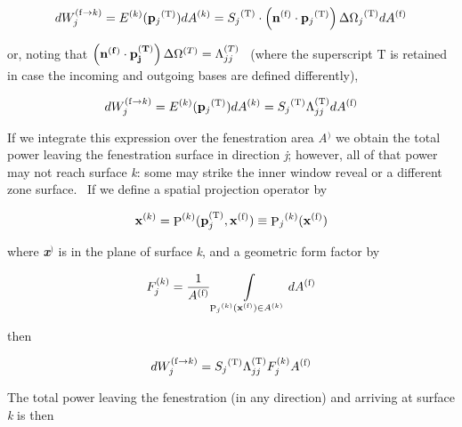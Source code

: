 \begin{equation}
dW_j^{{\rm{(f}} \to k{\rm{)}}} = {E^{{\rm{(}}k{\rm{)}}}}({{\bf{p}}_j}^{{\rm{(T)}}})d{A^{{\rm{(}}k{\rm{)}}}} = {S_j}^{{\rm{(T)}}} \cdot \left( {{{\bf{n}}^{{\rm{(f)}}}} \cdot {{\bf{p}}_j}^{{\rm{(T)}}}} \right)\Delta {\Omega_j}^{{\rm{(T)}}}d{A^{{\rm{(f)}}}}
\end{equation}

or, noting that \(\left(\bf{n}^{(f)}\cdot\bf{p}_j^{(T)}\right) \Delta\Omega^{(T)} = \Lambda_{jj}^{(T)}\) ~(where the superscript T is retained in case the incoming and outgoing bases are defined differently),

\begin{equation}
dW_j^{{\rm{(f}} \to k{\rm{)}}} = {E^{{\rm{(}}k{\rm{)}}}}({{\bf{p}}_j}^{{\rm{(T)}}})d{A^{{\rm{(}}k{\rm{)}}}} = {S_j}^{{\rm{(T)}}}\Lambda_{jj}^{{\rm{(T)}}}d{A^{{\rm{(f)}}}}
\end{equation}

If we integrate this expression over the fenestration area \emph{A}\(^{)}\) we obtain the total power leaving the fenestration surface in direction \emph{j}; however, all of that power may not reach surface \emph{k}: some may strike the inner window reveal or a different zone surface.~ If we define a spatial projection operator by

\begin{equation}
{{\bf{x}}^{{\rm{(}}k{\rm{)}}}} = {{\mathop{\rm P}\nolimits} ^{{\rm{(}}k{\rm{)}}}}({\bf{p}}_j^{{\rm{(T)}}},{{\bf{x}}^{{\rm{(f)}}}}) \equiv {{\mathop{\rm P}\nolimits}_j}^{{\rm{(}}k{\rm{)}}}({{\bf{x}}^{{\rm{(f)}}}})
\end{equation}

where \textbf{\emph{x}}\(^{)}\) is in the plane of surface \emph{k}, and a geometric form factor by

\begin{equation}
F_j^{{\rm{(}}k{\rm{)}}} = \frac{1}{{{A^{{\rm{(f)}}}}}}\int\limits_{{{\mathop{\rm P}\nolimits}_j}^{{\rm{(}}k{\rm{)}}}({{\bf{x}}^{{\rm{(f)}}}}) \in {A^{{\rm{(}}k{\rm{)}}}}} {d{A^{{\rm{(f)}}}}}
\end{equation}

then

\begin{equation}
dW_j^{{\rm{(f}} \to k{\rm{)}}} = {S_j}^{{\rm{(T)}}}\Lambda_{jj}^{{\rm{(T)}}}F_j^{{\rm{(}}k{\rm{)}}}{A^{{\rm{(f)}}}}
\end{equation}

The total power leaving the fenestration (in any direction) and arriving at surface \emph{k} is then

